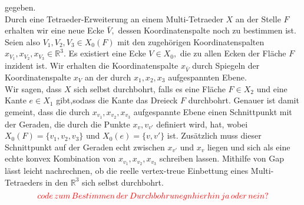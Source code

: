 \documentclass[12pt,titlepage,twoside,cleardoublepage]{article}
\theoremstyle{nummermitklammern}
\numberwithin{equation}{section}
\begin{document}
gegeben.\\
Durch eine Tetraeder-Erweiterung an einem Multi-Tetraeder $X$ an der Stelle $F$ erhalten wir eine neue Ecke $\bar{V},$ dessen Koordinatenspalte noch zu bestimmen ist. 
Seien also $V_1,V_2,V_3\in X_0(F)$ mit den zugehörigen Koordinatenspalten $x_{V_1},x_{V_2},x_{V_3}\in \mathbb{R}^3.$ Es existiert eine Ecke $V\in X_0,$ die zu allen Ecken der Fläche $F$ inzident ist. Wir erhalten die Koordinatenspalte $x_{\bar{V}}$ durch Spiegeln der Koordinatenspalte $x_V$ an der durch $x_{1},x_{2},x_{3}$ aufgespannten Ebene. \\
Wir sagen, dass $X$ sich selbst durchbohrt, falls es eine Fläche $F\in X_2$ und eine Kante $e\in X_1$ gibt,sodass die Kante das Dreieck $F$ durchbohrt. Genauer ist damit gemeint, dass die durch $x_{v_1},x_{v_2},x_{v_3}$ aufgespannte Ebene einen Schnittpunkt mit der Geraden, die durch die Punkte $x_v,v_{v'}$ definiert wird, hat, wobei $X_0(F)=\{v_1,v_2,v_3\}$ und $X_0(e)=\{v,v'\}$ ist. Zusätzlich muss dieser Schnittpunkt auf der Geraden echt zwischen $x_{v'}$ und $x_{v}$ liegen und sich als eine echte konvex Kombination von $x_{v_1},x_{v_2},x_{v_3}$ schreiben lassen. 
Mithilfe von Gap lässt leicht nachrechnen, ob die reelle vertex-treue Einbettung eines Multi-Tetraeders in den $\mathbb{R}^3$ sich selbst durchbohrt.
\[
\textcolor{red}{code\, zum \,Bestimmen\, der\, Durchbohrunegn hier hin\, ja\, oder \,nein? }
\]
\end{document}
